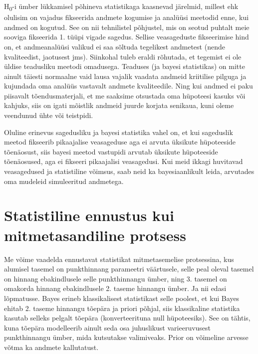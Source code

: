 \documentclass[]{book}
\begin{document}
H\textsubscript{0}-i ümber lükkamisel põhineva statistikaga kaasnevad järelmid, millest ehk olulisim on vajadus fikseerida andmete kogumise ja analüüsi meetodid enne, kui andmed on kogutud. See on nii tehnilistel põhjustel, mis on seotud puhtalt meie sooviga fikseerida 1. tüüpi vigade sagedus. Sellise veasageduste fikseerimise hind on, et andmeanalüüsi valikud ei saa sõltuda tegelikest andmetest (nende kvaliteedist, jaotusest jms). Siinkohal tuleb eraldi rõhutada, et tegemist ei ole üldise teadusliku meetodi omadusega. Teaduses (ja bayesi statistikas) on mitte ainult täiesti normaalne vaid lausa vajalik vaadata andmeid kriitilise pilguga ja kujundada oma analüüs vastavalt andmete kvaliteedile. Ning kui andmed ei paku piisavalt tõendusmaterjali, et me saaksime otsustada oma hüpoteesi kasuks või kahjuks, siis on igati mõistlik andmeid juurde korjata senikaua, kuni oleme veendunud ühte või teistpidi.

Oluline erinevus sagedusliku ja bayesi statistika vahel on, et kui sageduslik meetod fikseerib pikaajalise veasageduse aga ei arvuta üksikute hüpoteeside tõenäosust, siis bayesi meetod vastupidi arvutab üksikute hüpoteeside tõenäosused, aga ei fikseeri pikaajalisi veasagedusi. Kui meid ikkagi huvitavad veasagedused ja statistiline võimsus, saab neid ka bayesiaanlikult leida, arvutades oma mudeleid simuleeritud andmetega.

\hypertarget{statistiline-ennustus-kui-mitmetasandiline-protsess-1}{%
\section*{Statistiline ennustus kui mitmetasandiline protsess}\label{statistiline-ennustus-kui-mitmetasandiline-protsess-1}}

Me võime vaadelda ennustavat statistikat mitmetasemelise protsessina, kus alumisel tasemel on punkthinnang parameetri väärtusele, selle peal oleval tasemel on hinnang ebakindlusele selle punkthinnangu ümber, ning 3. tasemel on omakorda hinnang ebakindlusele 2. taseme hinnangu ümber. Ja nii edasi lõpmatusse. Bayes erineb klassikalisest statistikast selle poolest, et kui Bayes ehitab 2. taseme hinnangu tõepära ja priori põhjal, siis klassikaline statistika kasutab selleks pelgalt tõepära (konverteerituna null hüpoteesiks). See on tähtis, kuna tõepära modelleerib ainult seda osa juhuslikust varieeruvusest punkthinnangu ümber, mida kutsutakse valimiveaks. Prior on võimeline arvesse võtma ka andmete kallutatust.
\end{document}
